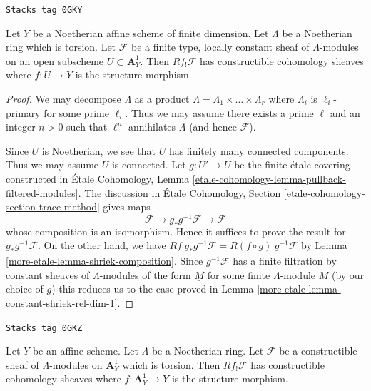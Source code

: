 \begin{lemma}
\label{more-etale-lemma-loc-constant-shriek-rel-dim-1}
\href{https://stacks.math.columbia.edu/tag/0GKY}{\texttt{Stacks tag 0GKY}}

Let $Y$ be a Noetherian affine scheme of finite dimension.
Let $\Lambda$ be a Noetherian ring which is torsion.
Let $\mathcal{F}$ be a finite type, locally constant sheaf of
$\Lambda$-modules on an open subscheme $U \subset \mathbf{A}^1_Y$.
Then $Rf_!\mathcal{F}$ has constructible cohomology sheaves where
$f : U \to Y$ is the structure morphism.
\end{lemma}

\begin{proof}
We may decompose $\Lambda$ as a product
$\Lambda = \Lambda_1 \times \ldots \times \Lambda_r$
where $\Lambda_i$ is $\ell_i$-primary for some prime $\ell_i$.
Thus we may assume there exists a prime $\ell$ and an integer $n > 0$
such that $\ell^n$ annihilates $\Lambda$ (and hence $\mathcal{F}$).

\medskip\noindent
Since $U$ is Noetherian, we see that $U$ has finitely many connected
components. Thus we may assume $U$ is connected.
Let $g : U' \to U$ be the finite \'etale covering
constructed in \'Etale Cohomology, Lemma
\ref{etale-cohomology-lemma-pullback-filtered-modules}.
The discussion in
\'Etale Cohomology, Section \ref{etale-cohomology-section-trace-method}
gives maps
$$
\mathcal{F} \to g_*g^{-1}\mathcal{F} \to \mathcal{F}
$$
whose composition is an isomorphism. Hence it suffices to
prove the result for $g_*g^{-1}\mathcal{F}$. On the other hand,
we have $Rf_!g_*g^{-1}\mathcal{F} = R(f \circ g)_!g^{-1}\mathcal{F}$
by Lemma \ref{more-etale-lemma-shriek-composition}.
Since $g^{-1}\mathcal{F}$ has a finite filtration by
constant sheaves of $\Lambda$-modules of the form
$\underline{M}$ for some finite $\Lambda$-module $M$
(by our choice of $g$) this reduces us to the case proved in
Lemma \ref{more-etale-lemma-constant-shriek-rel-dim-1}.
\end{proof}

\begin{lemma}
\label{more-etale-lemma-constructible-shriek-rel-dim-1}
\href{https://stacks.math.columbia.edu/tag/0GKZ}{\texttt{Stacks tag 0GKZ}}

Let $Y$ be an affine scheme. Let $\Lambda$ be a Noetherian ring.
Let $\mathcal{F}$ be a constructible sheaf of $\Lambda$-modules on
$\mathbf{A}^1_Y$ which is torsion. Then $Rf_!\mathcal{F}$ has constructible
cohomology sheaves where $f : \mathbf{A}^1_Y \to Y$ is the structure morphism.
\end{lemma}

